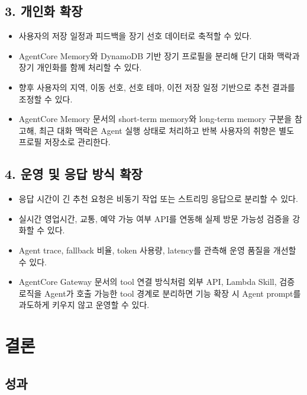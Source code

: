 \documentclass[12pt,a4paper]{article}
\newcommand{\DocNeedspace}[1]{\par\ifdim\dimexpr\pagegoal-\pagetotal\relax<#1\newpage\fi}
\begin{document}
\DocNeedspace{3\baselineskip}
\subsection*{3. 개인화 확장}


\begin{itemize}
\item 사용자의 저장 일정과 피드백을 장기 선호 데이터로 축적할 수 있다.
\item AgentCore Memory와 DynamoDB 기반 장기 프로필을 분리해 단기 대화 맥락과 장기 개인화를 함께 처리할 수 있다.
\item 향후 사용자의 지역, 이동 선호, 선호 테마, 이전 저장 일정 기반으로 추천 결과를 조정할 수 있다.
\item AgentCore Memory 문서의 short-term memory와 long-term memory 구분을 참고해, 최근 대화 맥락은 Agent 실행 상태로 처리하고 반복 사용자의 취향은 별도 프로필 저장소로 관리한다.
\end{itemize}


\DocNeedspace{3\baselineskip}
\subsection*{4. 운영 및 응답 방식 확장}


\begin{itemize}
\item 응답 시간이 긴 추천 요청은 비동기 작업 또는 스트리밍 응답으로 분리할 수 있다.
\item 실시간 영업시간, 교통, 예약 가능 여부 API를 연동해 실제 방문 가능성 검증을 강화할 수 있다.
\item Agent trace, fallback 비율, token 사용량, latency를 관측해 운영 품질을 개선할 수 있다.
\item AgentCore Gateway 문서의 tool 연결 방식처럼 외부 API, Lambda Skill, 검증 로직을 Agent가 호출 가능한 tool 경계로 분리하면 기능 확장 시 Agent prompt를 과도하게 키우지 않고 운영할 수 있다.
\end{itemize}


\DocNeedspace{10\baselineskip}
\section*{결론}


\DocNeedspace{8\baselineskip}
\subsection*{성과}
\end{document}
